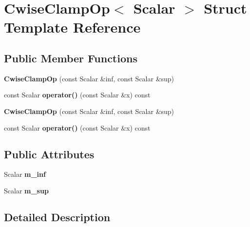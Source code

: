 \hypertarget{struct_cwise_clamp_op}{}\section{Cwise\+Clamp\+Op$<$ Scalar $>$ Struct Template Reference}
\label{struct_cwise_clamp_op}
\subsection*{Public Member Functions}
\begin{DoxyCompactItemize}
\item 
\mbox{\label{struct_cwise_clamp_op_a8448d03689f97481887d3c18df3ecb41}} 
{\bfseries Cwise\+Clamp\+Op} (const Scalar \&inf, const Scalar \&sup)
\item 
\mbox{\label{struct_cwise_clamp_op_a6ec2ecbfdab812e49d3ebf9f2047b5c7}} 
const Scalar {\bfseries operator()} (const Scalar \&x) const
\item 
\mbox{\label{struct_cwise_clamp_op_a8448d03689f97481887d3c18df3ecb41}} 
{\bfseries Cwise\+Clamp\+Op} (const Scalar \&inf, const Scalar \&sup)
\item 
\mbox{\label{struct_cwise_clamp_op_a6ec2ecbfdab812e49d3ebf9f2047b5c7}} 
const Scalar {\bfseries operator()} (const Scalar \&x) const
\end{DoxyCompactItemize}
\subsection*{Public Attributes}
\begin{DoxyCompactItemize}
\item 
\mbox{\label{struct_cwise_clamp_op_a4d3dc3f6c6fcd87519871b9be343e928}} 
Scalar {\bfseries m\+\_\+inf}
\item 
\mbox{\label{struct_cwise_clamp_op_a152e54ec7fe995a68a2cc1058db68d02}} 
Scalar {\bfseries m\+\_\+sup}
\end{DoxyCompactItemize}


\subsection{Detailed Description}
